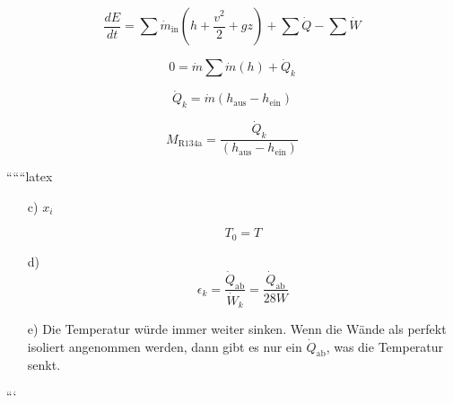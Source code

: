 \[
\frac{dE}{dt} = \sum \dot{m}_{\text{in}} (h + \frac{v^2}{2} + gz) + \sum \dot{Q} - \sum \dot{W}
\]

\[
0 = \dot{m} \sum \dot{m} (h) + \dot{Q}_k
\]

\[
\dot{Q}_k = \dot{m} (h_{\text{aus}} - h_{\text{ein}})
\]

\[
M_{\text{R134a}} = \frac{\dot{Q}_k}{(h_{\text{aus}} - h_{\text{ein}})}
\]

``````latex


\begin{itemize}
    \item[c)] \( x_i \)
    
    \[ T_0 = T \]
    
    \item[d)] 
    \[
    \epsilon_k = \frac{\dot{Q}_{\text{ab}}}{\dot{W}_k} = \frac{\dot{Q}_{\text{ab}}}{28W}
    \]
    
    \item[e)] Die Temperatur würde immer weiter sinken. Wenn die Wände als perfekt isoliert angenommen werden, dann gibt es nur ein \(\dot{Q}_{\text{ab}}\), was die Temperatur senkt.
    
\end{itemize}

```